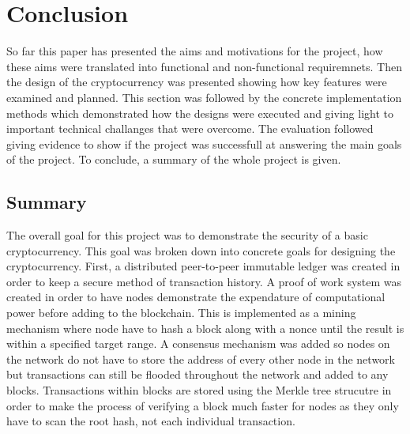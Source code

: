 \documentclass{l4proj}
\begin{document}
\chapter{Conclusion}
So far this paper has presented the aims and motivations for the project, how these aims were translated into functional
and non-functional requiremnets. Then the design of the cryptocurrency was presented showing how key features were examined
and planned. This section was followed by the concrete implementation methods which demonstrated how the designs were 
executed and giving light to important technical challanges that were overcome. The evaluation followed giving evidence
to show if the project was successfull at answering the main goals of the project. To conclude, a summary of the whole 
project is given.

\section{Summary}
The overall goal for this project was to demonstrate the security of a basic cryptocurrency. This goal was broken down
into concrete goals for designing the cryptocurrency. First, a distributed peer-to-peer immutable ledger was created 
in order to keep a secure method of transaction history. A proof of work system was created in order to have nodes
demonstrate the expendature of computational power before adding to the blockchain. This is implemented as a mining
mechanism where node have to hash a block along with a nonce until the result is within a specified target range. A
consensus mechanism was added so nodes on the network do not have to store the address of every other node in the network
but transactions can still be flooded throughout the network and added to any blocks. Transactions within blocks are
stored using the Merkle tree strucutre in order to make the process of verifying a block much faster for nodes as they
only have to scan the root hash, not each individual transaction.
\end{document}
